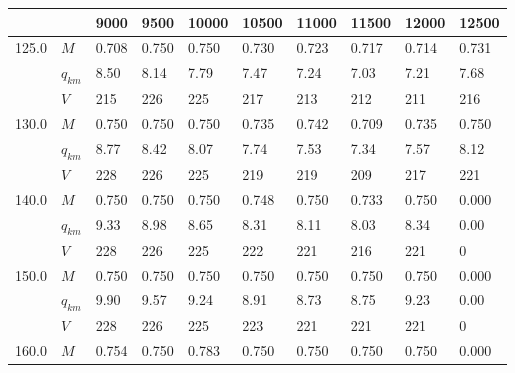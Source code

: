 \begin{tabular}{llllllllll}
\toprule
      &     &    9000 &    9500 &   10000 &   10500 &   11000 &                    11500 &                    12000 &                    12500 \\
\midrule
125.0 & $M$ &  0.708  &  0.750  &  0.750  &  0.730  &  0.723  &  0.717 \cellcolor{green} &                   0.714  &                   0.731  \\
      & $q_{km}$ &   8.50  &   8.14  &   7.79  &   7.47  &   7.24  &   7.03 \cellcolor{green} &                    7.21  &                    7.68  \\
      & $V$ &    215  &    226  &    225  &    217  &    213  &    212 \cellcolor{green} &                     211  &                     216  \\
130.0 & $M$ &  0.750  &  0.750  &  0.750  &  0.735  &  0.742  &  0.709 \cellcolor{green} &                   0.735  &                   0.750  \\
      & $q_{km}$ &   8.77  &   8.42  &   8.07  &   7.74  &   7.53  &   7.34 \cellcolor{green} &                    7.57  &                    8.12  \\
      & $V$ &    228  &    226  &    225  &    219  &    219  &    209 \cellcolor{green} &                     217  &                     221  \\
140.0 & $M$ &  0.750  &  0.750  &  0.750  &  0.748  &  0.750  &                   0.733  &                   0.750  &  0.000 \cellcolor{green} \\
      & $q_{km}$ &   9.33  &   8.98  &   8.65  &   8.31  &   8.11  &                    8.03  &                    8.34  &   0.00 \cellcolor{green} \\
      & $V$ &    228  &    226  &    225  &    222  &    221  &                     216  &                     221  &      0 \cellcolor{green} \\
150.0 & $M$ &  0.750  &  0.750  &  0.750  &  0.750  &  0.750  &                   0.750  &                   0.750  &  0.000 \cellcolor{green} \\
      & $q_{km}$ &   9.90  &   9.57  &   9.24  &   8.91  &   8.73  &                    8.75  &                    9.23  &   0.00 \cellcolor{green} \\
      & $V$ &    228  &    226  &    225  &    223  &    221  &                     221  &                     221  &      0 \cellcolor{green} \\
160.0 & $M$ &  0.754  &  0.750  &  0.783  &  0.750  &  0.750  &                   0.750  &                   0.750  &  0.000 \cellcolor{green} \\

\end{tabular}
